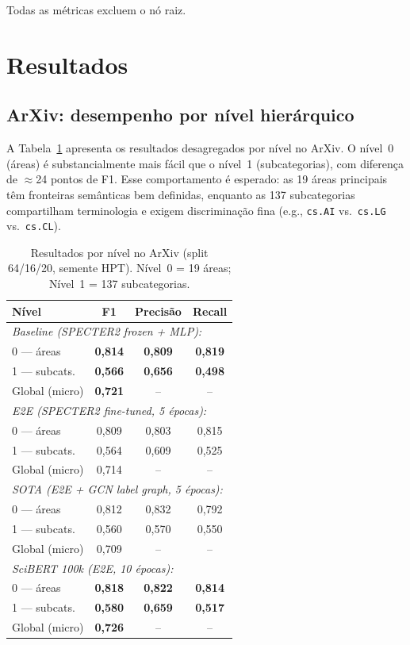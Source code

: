 \documentclass[11pt,a4paper,twoside]{article}
\newcommand{\ours}[1]{\textcolor{ourblue}{\textbf{#1}}}
\begin{document}
Todas as métricas excluem o nó raiz.

\section{Resultados}
\label{sec:results}

\subsection{ArXiv: desempenho por nível hierárquico}

A Tabela~\ref{tab:arxiv_levels} apresenta os resultados desagregados por nível
no ArXiv. O nível~0 (áreas) é substancialmente mais fácil que o nível~1
(subcategorias), com diferença de $\approx$24 pontos de F1. Esse comportamento é
esperado: as 19 áreas principais têm fronteiras semânticas bem definidas,
enquanto as 137 subcategorias compartilham terminologia e exigem discriminação
fina (e.g., \texttt{cs.AI} vs.\ \texttt{cs.LG} vs.\ \texttt{cs.CL}).

\begin{table}[htbp]
\centering
\caption{Resultados por nível no ArXiv (split 64/16/20, semente HPT).
         Nível~0 = 19 áreas; Nível~1 = 137 subcategorias.}
\label{tab:arxiv_levels}
\begin{tabular}{lccc}
\toprule
\textbf{Nível} & \textbf{F1} & \textbf{Precisão} & \textbf{Recall} \\
\midrule
\multicolumn{4}{l}{\textit{Baseline (SPECTER2 frozen + MLP):}} \\
0 --- áreas      & \ours{0,814} & \ours{0,809} & \ours{0,819} \\
1 --- subcats.   & \ours{0,566} & \ours{0,656} & \ours{0,498} \\
Global (micro)   & \ours{0,721} & --              & -- \\
\midrule
\multicolumn{4}{l}{\textit{E2E (SPECTER2 fine-tuned, 5 épocas):}} \\
0 --- áreas      & 0,809 & 0,803 & 0,815 \\
1 --- subcats.   & 0,564 & 0,609 & 0,525 \\
Global (micro)   & 0,714 & --              & -- \\
\midrule
\multicolumn{4}{l}{\textit{SOTA (E2E + GCN label graph, 5 épocas):}} \\
0 --- áreas      & 0,812 & 0,832 & 0,792 \\
1 --- subcats.   & 0,560 & 0,570 & 0,550 \\
Global (micro)   & 0,709 & --              & -- \\
\midrule
\multicolumn{4}{l}{\textit{SciBERT 100k (E2E, 10 épocas):}} \\
0 --- áreas      & \ours{0,818} & \ours{0,822} & \ours{0,814} \\
1 --- subcats.   & \ours{0,580} & \ours{0,659} & \ours{0,517} \\
Global (micro)   & \ours{0,726} & --              & -- \\
\bottomrule
\end{tabular}
\end{table}
\end{document}

